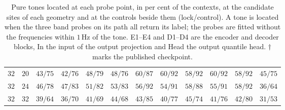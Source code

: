 \begin{table}[!tbp]
\begin{tabular}{@{}cccccccccccc@{}}
        $32$ & $20$ & $43/75$ & $42/76$ & $48/79$ & $48/76$ & $60/87$ & $60/92$ & $58/92$ & $60/92$ & $58/92$ & $45/75$ \\
        $32$ & $24$ & $46/78$ & $47/83$ & $51/82$ & $53/83$ & $56/92$ & $54/91$ & $58/88$ & $55/91$ & $58/92$ & $36/64$ \\
        $32$ & $32$ & $39/64$ & $36/70$ & $41/69$ & $44/68$ & $43/85$ & $40/77$ & $45/74$ & $41/76$ & $42/80$ & $31/53$ \\
        \bottomrule
    \end{tabular}
    \caption{Pure tones located at each probe point, in per cent of the contexts, at the candidate sites of each geometry and at the controls beside them (lock/control). A tone is located when the three band probes on its path all return its label; the probes are fitted without the frequencies within $1$\,Hz of the tone. E1--E4 and D1--D4 are the encoder and decoder blocks, In the input of the output projection and Head the output quantile head. $\dagger$ marks the published checkpoint.}
    \label{tab:probingLockControl}
\end{table}
